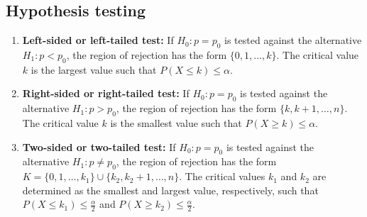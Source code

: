 \subsection{Hypothesis testing}
\begin{enumerate}
  \item \textbf{Left-sided or left-tailed test: } If $H_0 : p = p_0$ is tested against the alternative $H_1 : p < p_0$, the region of rejection has the form $\{0, 1, \ldots, k\}$. The critical value $k$ is the largest value such that $P(X \leq k) \leq \alpha$.
  \item \textbf{Right-sided or right-tailed test: } If \(H_0 : p = p_0\) is tested against the alternative \(H_1 : p > p_0\), the region of rejection has the form \(\{k, k + 1, \ldots , n\}\). The critical value \(k\) is the smallest value such that \(P(X \geq k) \leq \alpha\).
  \item \textbf{Two-sided or two-tailed test: } If \(H_0 : p = p_0\) is tested against the alternative \(H_1 : p \neq p_0\), the region of rejection has the form \(K = \{0, 1, \ldots , k_1\} \cup \{k_2, k_2+1, \ldots , n\}\). The critical values \(k_1\) and \(k_2\) are determined as the smallest and largest value, respectively, such that \(P(X \leq k_1) \leq \frac{\alpha}{2}\) and \(P(X \geq k_2) \leq \frac{\alpha}{2}\).

\end{enumerate}

